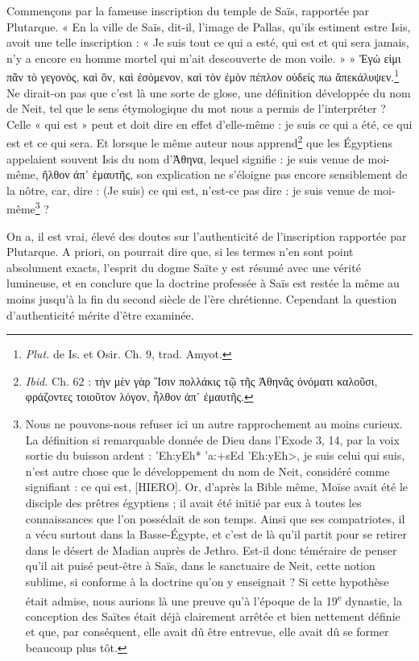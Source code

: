 \documentclass[a4paper, 11pt, oneside]{article}
\begin{document}
Commençons par la fameuse inscription du temple de Saïs, rapportée par Plutarque. « En la ville de Saïs, dit-il, l'image de Pallas, qu'ils estiment estre Isis, avoit une telle inscription : « Je suis tout ce qui a esté, qui est et qui sera jamais, n'y a encore eu homme mortel qui m'ait descouverte de mon voile. » » Ἐγώ εἰμι πᾶν τὸ γεγονὸς, καὶ ὃν, καὶ ἐσόμενον, καὶ τὸν ἐμὸν πέπλον οὐδείς πω ἄπεκάλυψεν.\footnote{\emph{Plut.} de Is. et Osir. Ch. 9, trad. Amyot.} Ne dirait-on pas que c'est là une sorte de glose, une définition développée du nom de Neit, tel que le sens étymologique du mot nous a permis de l'interpréter ? Celle « qui est » peut et doit dire en effet d'elle-même : je suis ce qui a été, ce qui est et ce qui sera. Et lorsque le même auteur nous apprend\footnote{\emph{Ibid.} Ch. 62 : τὴν μὲν γὰρ Ἲσιν πολλάκις τῷ τῆς Ἀθηνᾶς ὀνόματι καλοῦσι, φράζοντες τοιοῦτον λόγον, ἦλθον ἀπ᾿ ἐμαυτῆς.} que les Égyptiens appelaient souvent Isis du nom d'Ἀθηνα, lequel signifie : je suis venue de moi-même, ἤλθον ἀπ᾽ ἐμαυτῆς, son explication ne s'éloigne pas encore sensiblement de la nôtre, car, dire : (Je suis) ce qui est, n'est-ce pas dire : je suis venue de moi-même\footnote{Nous ne pouvons-nous refuser ici un autre rapprochement au moins curieux. La définition si remarquable donnée de Dieu dans l'Exode 3, 14, par la voix sortie du buisson ardent : \foreignlanguage{hebrew}{\<'Eh:yEh* 'a:+sEd 'Eh:yEh>}, je suis celui qui suis, n'est autre chose que le développement du nom de Neit, considéré comme signifiant : ce qui est, [HIERO]. Or, d'après la Bible même, Moïse avait été le disciple des prêtres égyptiens ; il avait été initié par eux à toutes les connaissances que l'on possédait de son temps. Ainsi que ses compatriotes, il a vécu surtout dans la Basse-Égypte, et c'est de là qu'il partit pour se retirer dans le désert de Madian auprès de Jethro. Est-il donc téméraire de penser qu'il ait puisé peut-être à Saïs, dans le sanctuaire de Neit, cette notion sublime, si conforme à la doctrine qu'on y enseignait ?  Si cette hypothèse était admise, nous aurions là une preuve qu'à l'époque de la 19\textsuperscript{e} dynastie, la conception des Saïtes était déjà clairement arrêtée et bien nettement définie et que, par conséquent, elle avait dû être entrevue, elle avait dû se former beaucoup plus tôt.} ?

On a, il est vrai, élevé des doutes sur l'authenticité de l'inscription rapportée par Plutarque. A priori, on pourrait dire que, si les termes n'en sont point absolument exacts, l'esprit du dogme Saïte y est résumé avec une vérité lumineuse, et en conclure que la doctrine professée à Saïs est restée la même au moins jusqu'à la fin du second siècle de l'ère chrétienne. Cependant la question d'authenticité mérite d'être examinée.
\end{document}
